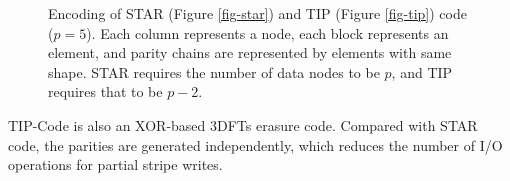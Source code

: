 \documentclass[sigconf]{acmart}
\begin{document}
\begin{figure}[!ht]
\centering
{}
\hspace{5pt}
\vspace{-3mm}
\caption{\small{Encoding of STAR (Figure \ref{fig-star}) and TIP (Figure \ref{fig-tip}) code ($p = 5$). Each column represents a node, each block represents an element, and parity chains are represented by elements with same shape. STAR requires the number of data nodes to be $p$, and TIP requires that to be $p-2$.}}
\vspace{-3mm}
\label{fig-star-tip}
\end{figure}

TIP-Code is also an XOR-based 3DFTs erasure code.
Compared with STAR code, the parities are generated independently, which reduces the number of I/O operations for partial stripe writes.
\end{document}

